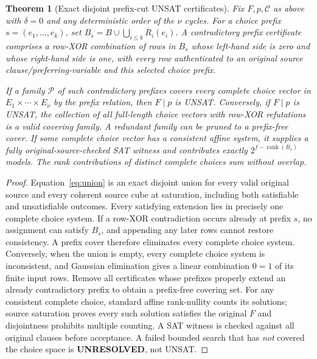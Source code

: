 \documentclass[11pt]{article}
\newtheorem{theorem}{Theorem}
\begin{document}
\begin{theorem}[Exact disjoint prefix-cut UNSAT certificates]\label{thm:prefix}
Fix $F,p,\mathcal C$ as above with $\delta=0$ and any deterministic order of the $\nu$ cycles. For a choice prefix $s=(e_1,\ldots,e_k)$, set $B_s=B\cup\bigcup_{i\le k}R_i(e_i)$. A \emph{contradictory prefix certificate} comprises a row-XOR combination of rows in $B_s$ whose left-hand side is zero and whose right-hand side is one, with every row authenticated to an original source clause/preferring-variable and this selected choice prefix.

If a family $\mathcal P$ of such contradictory prefixes covers every complete choice vector in $E_1\times\cdots\times E_\nu$ by the prefix relation, then $F\mid p$ is UNSAT. Conversely, if $F\mid p$ is UNSAT, the collection of all full-length choice vectors with row-XOR refutations is a valid covering family. A redundant family can be pruned to a prefix-free cover. If some complete choice vector has a consistent affine system, it supplies a fully original-source-checked SAT witness and contributes exactly $2^{f-\operatorname{rank}(B_s)}$ models. The rank contributions of distinct complete choices sum without overlap.
\end{theorem}
\begin{proof}
Equation~\eqref{eq:union} is an exact disjoint union for every valid original source and every coherent source cube at saturation, including both satisfiable and unsatisfiable outcomes. Every satisfying extension lies in precisely one complete choice system. If a row-XOR contradiction occurs already at prefix $s$, no assignment can satisfy $B_s$, and appending any later rows cannot restore consistency. A prefix cover therefore eliminates every complete choice system. Conversely, when the union is empty, every complete choice system is inconsistent, and Gaussian elimination gives a linear combination $0=1$ of its finite input rows. Remove all certificates whose prefixes properly extend an already contradictory prefix to obtain a prefix-free covering set. For any consistent complete choice, standard affine rank-nullity counts its solutions; source saturation proves every such solution satisfies the original $F$ and disjointness prohibits multiple counting. A SAT witness is checked against all original clauses before acceptance. A failed bounded search that has \emph{not} covered the choice space is \textbf{UNRESOLVED}, not UNSAT.
\end{proof}
\end{document}
